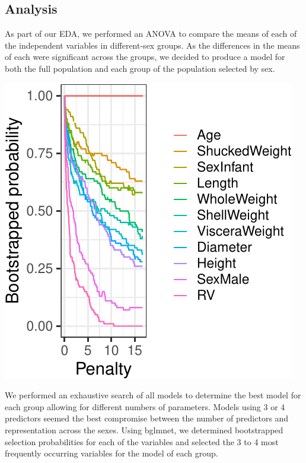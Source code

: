 \documentclass[letterpaper,9pt,twocolumn,twoside,]{pinp}
\begin{document}
\hypertarget{analysis}{%
\subsection{Analysis}\label{analysis}}

As part of our EDA, we performed an ANOVA to compare the means of each
of the independent variables in different-sex groups. As the differences
in the means of each were significant across the groups, we decided to
produce a model for both the full population and each group of the
population selected by sex.

\begin{center}\includegraphics{Executive-summary-Group-Work_files/figure-latex/unnamed-chunk-2-1} \end{center}

We performed an exhaustive search of all models to determine the best
model for each group allowing for different numbers of parameters.
Models using 3 or 4 predictors seemed the best compromise between the
number of predictors and representation across the sexes. Using bglmnet,
we determined bootstrapped selection probabilities for each of the
variables and selected the 3 to 4 most frequently occurring variables
for the model of each group.
\end{document}
